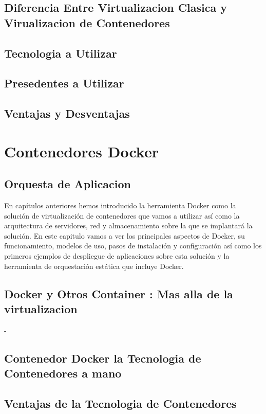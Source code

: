 \documentclass[%
 reprint,
 amsmath,amssymb,
 aps,
]{revtex4-1}
\begin{document}
\subsection{Diferencia Entre Virtualizacion Clasica y Virualizacion de Contenedores}
\subsection{Tecnologia a Utilizar}
\subsection{Presedentes a Utilizar}
\subsection{Ventajas y Desventajas}


\section{Contenedores Docker}\label{sec:6}
\subsection{Orquesta de Aplicacion}
En capítulos anteriores hemos introducido la herramienta Docker como la solución de
virtualización de contenedores que vamos a utilizar así como la arquitectura de servidores, red y
almacenamiento sobre la que se implantará la solución.
En este capitulo vamos a ver los principales aspectos de Docker, su funcionamiento, modelos de
uso, pasos de instalación y configuración así como los primeros ejemplos de despliegue de
aplicaciones sobre esta solución y la herramienta de orquestación estática que incluye Docker.
\subsection{Docker y Otros Container : Mas alla de la virtualizacion}
- 
\subsection{Contenedor Docker la Tecnologia de Contenedores a mano}
\subsection{Ventajas de la Tecnologia de Contenedores}
\end{document}
